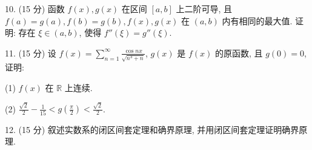 \documentclass{examcollection}
\begin{document}
{\begin{minipage}{\textwidth}
10. (15 分) 函数 $f(x), g(x)$ 在区间 $[a, b]$ 上二阶可导, 且 $f(a) = g(a), f(b) = g(b), f(x), g(x)$ 在 $(a, b)$ 内有相同的最大值. 证明: 存在 $\xi \in (a, b)$, 使得 $f''(\xi) = g''(\xi)$.\par
11. (15 分) 设 $f(x) = \sum_{n=1}^{\infty} \frac{\cos nx}{\sqrt{n^3 + n}}$, $g(x)$ 是 $f(x)$ 的原函数, 且 $g(0) = 0$, 证明:\par
(1) $f(x)$ 在 $\mathbb{R}$ 上连续.\par
(2) $\frac{\sqrt{2}}{2} - \frac{1}{15} < g\left(\frac{\pi}{2}\right) < \frac{\sqrt{2}}{2}$.\par
12. (15 分) 叙述实数系的闭区间套定理和确界原理, 并用闭区间套定理证明确界原理.\par
\end{minipage}}
\ifdim\dimexpr\ht\proofbox+\dp\proofbox\relax>\textheight
\noindent\resizebox{!}{\textheight}{\usebox{\proofbox}}\else\noindent\usebox{\proofbox}\fi\clearpage
\end{document}
